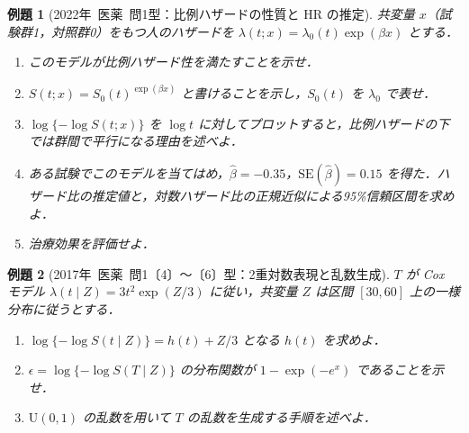 \documentclass[a4paper,11pt,openany]{ltjsbook}
\newtheorem{reidai}{例題}[chapter]
\newcommand{\kakomon}[2]{\mbox{#1年 医薬 問#2}}
\newcommand{\SE}{\mathrm{SE}}
\newcommand{\Unif}{\mathrm{U}}
\begin{document}
\begin{reidai}[\kakomon{2022}{1}型：比例ハザードの性質と HR の推定]\label{reidai:m03-2}
共変量 $x$（試験群1，対照群0）をもつ人のハザードを $\lambda(t;x)=\lambda_0(t)\exp(\beta x)$ とする．
\begin{enumerate}[label=〔\arabic*〕]
\item このモデルが比例ハザード性を満たすことを示せ．
\item $S(t;x)=S_0(t)^{\exp(\beta x)}$ と書けることを示し，$S_0(t)$ を $\lambda_0$ で表せ．
\item $\log\{-\log S(t;x)\}$ を $\log t$ に対してプロットすると，比例ハザードの下では群間で平行になる理由を述べよ．
\item ある試験でこのモデルを当てはめ，$\hat\beta=-0.35$，$\SE(\hat\beta)=0.15$ を得た．ハザード比の推定値と，対数ハザード比の正規近似による95\%信頼区間を求めよ．
\item 治療効果を評価せよ．
\end{enumerate}
\end{reidai}

\begin{reidai}[\kakomon{2017}{1}〔4〕〜〔6〕型：2重対数表現と乱数生成]\label{reidai:m03-3}
$T$ が Cox モデル $\lambda(t\mid Z)=3t^2\exp(Z/3)$ に従い，共変量 $Z$ は区間 $[30,60]$ 上の一様分布に従うとする．
\begin{enumerate}[label=〔\arabic*〕]
\item $\log\{-\log S(t\mid Z)\}=h(t)+Z/3$ となる $h(t)$ を求めよ．
\item $\epsilon=\log\{-\log S(T\mid Z)\}$ の分布関数が $1-\exp(-e^x)$ であることを示せ．
\item $\Unif(0,1)$ の乱数を用いて $T$ の乱数を生成する手順を述べよ．
\end{enumerate}
\end{reidai}

\end{document}
